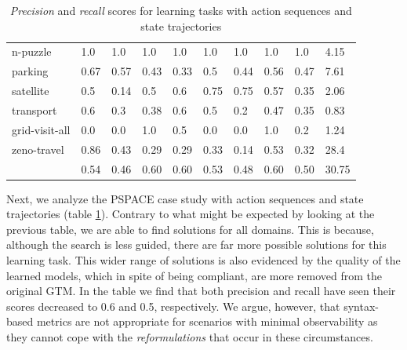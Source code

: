 \begin{table}[hbt!]
\begin{center}
\begin{tabular}{l|l|l|l|l|l|l||l|l|l|}
			n-puzzle & 1.0 & 1.0 & 1.0 & 1.0 & 1.0 & 1.0 & 1.0 & 1.0& 4.15 \\ %
			parking & 0.67 & 0.57 & 0.43 & 0.33 & 0.5 & 0.44 & 0.56 & 0.47& 7.61 \\ %
			satellite & 0.5 & 0.14 & 0.5 & 0.6 & 0.75 & 0.75 & 0.57 & 0.35& 2.06 \\ %
			transport & 0.6 & 0.3 & 0.38 & 0.6 & 0.5 & 0.2 & 0.47 & 0.35& 0.83 \\ %
			grid-visit-all & 0.0 & 0.0 & 1.0 & 0.5 & 0.0 & 0.0 & 1.0 & 0.2& 1.24 \\ %
			zeno-travel & 0.86 & 0.43 & 0.29 & 0.29 & 0.33 & 0.14 & 0.53 & 0.32& 28.4 \\ %
			\hline
			\bf & 0.54 & 0.46 & 0.60 & 0.60 & 0.53 & 0.48 & 0.60 & 0.50 & 30.75
		\end{tabular}
	\end{center}
	\caption{\small {\em Precision} and {\em recall} scores for learning tasks with \NO action sequences and \NO state trajectories}
	\label{tab:results_minimum_0_0}
\end{table}

Next, we analyze the PSPACE case study with \NO action sequences and state trajectories (table \ref{tab:results_minimum_0_0}). Contrary to what might be expected by looking at the previous table, we are able to find solutions for all domains. This is because, although the search is less guided, there are far more possible solutions for this learning task. This wider range of solutions is also evidenced by the quality of the learned models, which in spite of being compliant, are more removed from the original GTM. In the table we find that both precision and recall have seen their scores decreased to 0.6 and 0.5, respectively. We argue, however, that syntax-based metrics are not appropriate for scenarios with minimal observability as they cannot cope with the \emph{reformulations} that occur in these circumstances.

